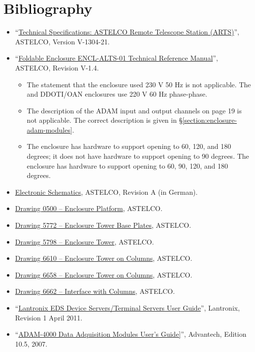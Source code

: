 \section{Bibliography}

\begin{flushleft}
\begin{itemize}
\item “\href{bibliography/astelco-enclosure-data-sheet.pdf}{Technical Specifications: ASTELCO Remote Telescope Station (ARTS)}”, ASTELCO, Version V-1304-21.
\item “\href{bibliography/astelco-enclosure-technical-reference-manual.pdf}{Foldable Enclosure ENCL-ALTS-01 Technical Reference Manual}”, ASTELCO, Revision V-1.4.
\begin{itemize}
\item The statement that the enclosure used 230 V 50 Hz is not applicable. The {\projectname} and DDOTI/OAN enclosures use 220 V 60 Hz phase-phase.
\item The description of the ADAM input and output channels on page 19 is not applicable. The correct description is given in \S\ref{section:enclosure-adam-modules}.
\item 
\ifcoatli
The {\projectname} enclosure has hardware to support opening to 60, 120, and 180 degrees; it does not have hardware to support opening to 90 degrees. 
\fi
\ifddoti
The {\projectname} enclosure has hardware to support opening to 60, 90, 120, and 180 degrees.
\fi
\end{itemize}
\item \href{bibliography/astelco-enclosure-electronics-schematics.pdf}{Electronic Schematics}, ASTELCO, Revision A (in German).
\item \href{bibliography/astelco-enclosure-drawing-0500.pdf}{Drawing 0500 -- Enclosure Platform}, ASTELCO.
\item \href{bibliography/astelco-enclosure-drawing-5772.pdf}{Drawing 5772 -- Enclosure Tower Base Plates}, ASTELCO.
\item \href{bibliography/astelco-enclosure-drawing-5798.pdf}{Drawing 5798 -- Enclosure Tower}, ASTELCO.
\item \href{bibliography/astelco-enclosure-drawing-6610.pdf}{Drawing 6610 -- Enclosure Tower on Columns}, ASTELCO.
\item \href{bibliography/astelco-enclosure-drawing-6658.pdf}{Drawing 6658 -- Enclosure Tower on Columns}, ASTELCO.
\item \href{bibliography/astelco-enclosure-drawing-6662.pdf}{Drawing 6662 -- Interface with Columns}, ASTELCO.
\item “\href{bibliography/lantronix-eds-user-guide.pdf}{Lantronix EDS Device Servers/Terminal Servers User Guide}”, Lantronix, Revision 1 April 2011.
\item “\href{bibliography/advantech-adam-4000.pdf}{ADAM-4000 Data Adquisition Modules User's Guide]}”, Advantech, Edition 10.5, 2007.
\end{itemize}
\end{flushleft}